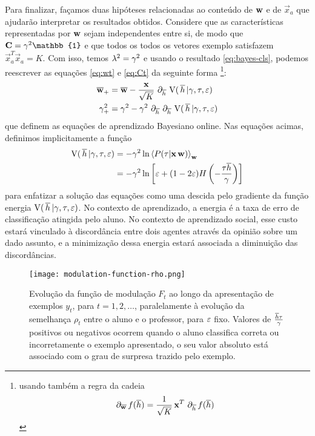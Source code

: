 \newcommand{\tgE}{\ensuremath{\gamma}} \newcommand{\gmT}{\ensuremath{\tgE_+}}
\newcommand{\gmt}{\ensuremath{\tgE}}
\newcommand{\EV}{\ensuremath{\mathrm{V}(\,\htv\,|\gmt,\tau,\ns)}}
Para finalizar, façamos duas hipóteses relacionadas ao conteúdo de $\mathbf{w}$ e de $\vec{x}_a$ que ajudarão interpretar os resultados obtidos.
Considere que as características representadas por $\mathbf{w}$ sejam independentes entre si, de modo que $\Ct = \tgE^2 \mathbb{1}$ e que todos os todos os vetores exemplo satisfazem $\vec{x}_a^T\vec{x}_a = K$.
Com isso, temos $\varh^2 = \tgE^2$ e usando o resultado \eqref{eq:bayes-cls}, podemos reescrever as equações \eqref{eq:wt} e \eqref{eq:Ct} da seguinte forma \footnote{usando também a regra da cadeia \[\,\partial_{\overline{\mathbf{w}}}\, f(\overline{h}) =
  \frac{1}{\sqrt{K}}\,\mathbf{x}^T\,\,\partial_{\overline{h}}\, f(\overline{h})\]}:
\begin{align}
    \wT & = \wt - \frac{\vec{x}}{\sqrt{K}}\,
    \del{\htv}\,\EV \label{eq:wt-V} \\
    \gmT^2 & = \gmt^2 - \gmt^2\,
    \del{\htv}\del{\htv}\,\EV \label{eq:Ct-V}
\end{align}
que definem as equações de aprendizado Bayesiano online.
Nas equações acimas, definimos implicitamente a função
\begin{align}\label{eq:Vh}
    \EV & = - \gmt^2\ln \Ex{\lkl}_{\rl} \notag \\
    & = -\gmt^2\ln \inbk{\ns + (1-2\ns)H\inpr{-\frac{\tau\htv}{\gmt}}}
\end{align}
para enfatizar a solução das equações como uma descida pelo gradiente da função energia $\EV$.
No contexto de aprendizado, a energia é a taxa de erro de classificação atingida pelo aluno.
No contexto de aprendizado social, esse custo estará vinculado à discordância entre dois agentes através da opinião sobre um dado assunto, e a minimização dessa energia estará associada a diminuição das discordâncias.

\begin{figure*}[h!]\label{fig:Frho}
  \caption{Evolução da função de modulação $F_t$ ao longo da     apresentação de exemplos $y_t$, para $t=1,2,\dots$, paralelamente à evolução da semelhança $\rho_t$ entre o aluno e o professor, para $\varepsilon$ fixo. Valores de $\frac{\htv\tau}{\gmt}$ positivos ou  negativos ocorrem quando o aluno classifica correta ou incorretamente o exemplo apresentado, o seu valor absoluto está associado com o grau de surpresa trazido pelo exemplo.}
  \centering \texttt{[image: modulation-function-rho.png]}
\end{figure*}

